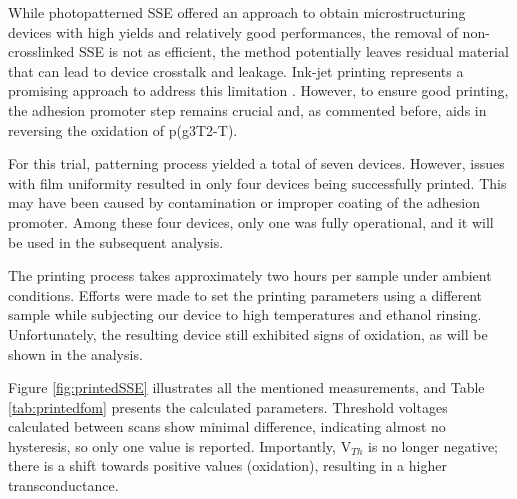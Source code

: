 While photopatterned SSE offered an approach to obtain microstructuring devices with high yields and relatively good performances, the removal of non-crosslinked SSE is not as efficient, the method potentially leaves residual material that can lead to device crosstalk and leakage. Ink-jet printing represents a promising approach to address this limitation \cite{tsengThresholdVoltageControl2023}. However, to ensure good printing, the adhesion promoter step remains crucial and, as commented before, aids in reversing the oxidation of p(g3T2-T).

For this trial, patterning process yielded a total of seven devices. However, issues with film uniformity resulted in only four devices being successfully printed. This may have been caused by contamination or improper coating of the adhesion promoter. Among these four devices, only one was fully operational, and it will be used in the subsequent analysis.

The printing process takes approximately two hours per sample under ambient conditions. Efforts were made to set the printing parameters using a different sample while subjecting our device to high temperatures and ethanol rinsing. Unfortunately, the resulting device still exhibited signs of oxidation, as will be shown in the analysis.

Figure \ref{fig:printedSSE} illustrates all the mentioned measurements, and Table \ref{tab:printedfom} presents the calculated parameters. Threshold voltages calculated between scans show minimal difference, indicating almost no hysteresis, so only one value is reported. Importantly, V$_{Th}$ is no longer negative; there is a shift towards positive values (oxidation), resulting in a higher transconductance.

